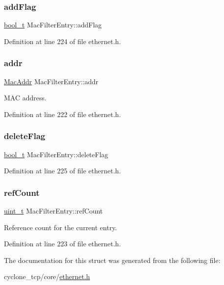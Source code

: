 \subsubsection{\texorpdfstring{add\+Flag}{addFlag}}
{\footnotesize\ttfamily \hyperlink{compiler__port_8h_a812d16e5494522586b3784e55d479912}{bool\+\_\+t} Mac\+Filter\+Entry\+::add\+Flag}



Definition at line 224 of file ethernet.\+h.

\mbox{\label{structMacFilterEntry_a30caa211d6cc1bb2416165526a2ab6cb}} 
\subsubsection{\texorpdfstring{addr}{addr}}
{\footnotesize\ttfamily \hyperlink{ethernet_8h_a1e00ed3977e8a770e8b4ae4cb306d1c0}{Mac\+Addr} Mac\+Filter\+Entry\+::addr}



M\+AC address. 



Definition at line 222 of file ethernet.\+h.

\mbox{\label{structMacFilterEntry_a4fd4a00a88556b70cb2582762cdb8b19}} 
\subsubsection{\texorpdfstring{delete\+Flag}{deleteFlag}}
{\footnotesize\ttfamily \hyperlink{compiler__port_8h_a812d16e5494522586b3784e55d479912}{bool\+\_\+t} Mac\+Filter\+Entry\+::delete\+Flag}



Definition at line 225 of file ethernet.\+h.

\mbox{\label{structMacFilterEntry_a4a1195d4086f58ef57862fa43551e73a}} 
\subsubsection{\texorpdfstring{ref\+Count}{refCount}}
{\footnotesize\ttfamily \hyperlink{compiler__port_8h_a12a1e9b3ce141648783a82445d02b58d}{uint\+\_\+t} Mac\+Filter\+Entry\+::ref\+Count}



Reference count for the current entry. 



Definition at line 223 of file ethernet.\+h.



The documentation for this struct was generated from the following file\+:\begin{DoxyCompactItemize}
\item 
cyclone\+\_\+tcp/core/\hyperlink{ethernet_8h}{ethernet.\+h}\end{DoxyCompactItemize}
